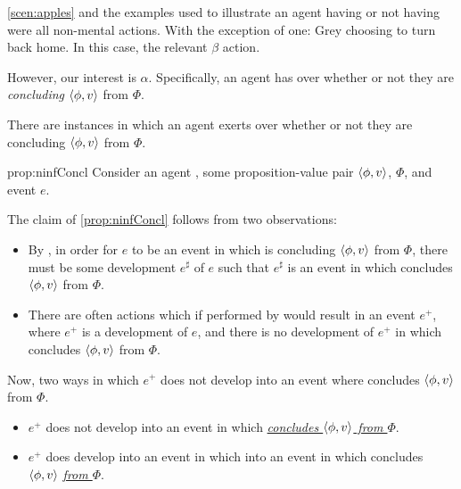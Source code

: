 \begin{note}
  \nocite{Peacocke:2021aa}
  \autoref{scen:apples} and the examples used to illustrate an agent having or not having \ninf{} were all non-mental actions.
  With the exception of one:
  Grey choosing to turn back home.
  In this case, the relevant \(\beta\) action.

  However, our interest is \(\alpha\).
  Specifically, an agent has \ninf{} over whether or not they are \emph{concluding} \(\langle \phi, v \rangle\) from \(\Phi\).

  \begin{proposition}
    \label{prop:ninfConcl}
    There are instances in which an agent exerts  over whether or not they are concluding \(\langle \phi, v \rangle\) from \(\Phi\).
  \end{proposition}

  \begin{argument}{prop:ninfConcl}
    Consider an agent \vAgent{}, some proposition-value pair \(\langle \phi, v \rangle\), \pool{} \(\Phi\), and event \(e\).

    The claim of \autoref{prop:ninfConcl} follows from two observations:

    \begin{itemize}[noitemsep]
    \item
      By , in order for \(e\) to be an event in which \vAgent{} is concluding \(\langle \phi, v \rangle\) from \(\Phi\), there must be some  development \(e^{\sharp}\) of \(e\) such that \(e^{\sharp}\) is an event in which \vAgent{} concludes \(\langle \phi, v \rangle\) from \(\Phi\).
    \end{itemize}

    \begin{itemize}
    \item
      There are often actions which if performed by \vAgent{} would result in an event \(e^{+}\), where \(e^{+}\) is a development of \(e\), and there is no  development of \(e^{+}\) in which \vAgent{} concludes \(\langle \phi, v \rangle\) from \(\Phi\).
    \end{itemize}

    Now, two ways in which \(e^{+}\) does not develop into an event where \vAgent{} concludes \(\langle \phi, v \rangle\) from \(\Phi\).
    \begin{itemize}
    \item
      \(e^{+}\) does not develop into an event in which \vAgent{} \emph{\underline{concludes \(\langle \phi, v \rangle\) from \(\Phi\)}}.
    \item
      \(e^{+}\) does develop into an event in which  into an event in which \vAgent{} concludes \(\langle \phi, v \rangle\) \emph{\underline{from \(\Phi\)}}.
    \end{itemize}


\end{argument}
\end{note}
